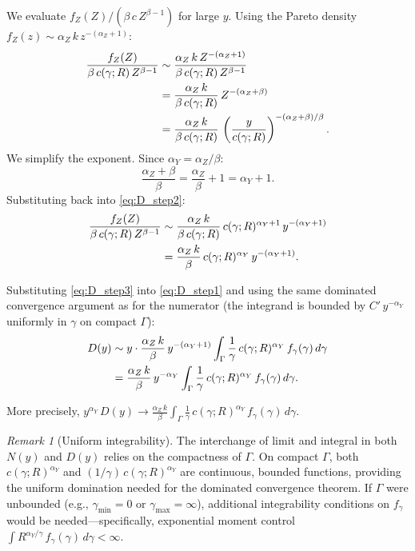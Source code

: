 \documentclass[12pt,a4paper]{article}
\theoremstyle{definition}
\theoremstyle{plain}
\theoremstyle{remark}
\newtheorem{remark}{Remark}[section]
\begin{document}
We evaluate $f_Z(Z)/(\beta\,c\,Z^{\beta-1})$ for large $y$.  Using the Pareto density $f_Z(z) \sim \alpha_Z\,k\,z^{-(\alpha_Z+1)}$:
\begin{align}
  \frac{f_Z(Z)}{\beta\,c(\gamma;R)\,Z^{\beta-1}}
  &\sim \frac{\alpha_Z\,k\,Z^{-(\alpha_Z+1)}}{\beta\,c(\gamma;R)\,Z^{\beta-1}} \notag \\
  &= \frac{\alpha_Z\,k}{\beta\,c(\gamma;R)}\,Z^{-(\alpha_Z+\beta)} \notag \\
  &= \frac{\alpha_Z\,k}{\beta\,c(\gamma;R)}\,\left(\frac{y}{c(\gamma;R)}\right)^{-(\alpha_Z+\beta)/\beta}. \label{eq:D_step2}
\end{align}
We simplify the exponent.  Since $\alpha_Y = \alpha_Z/\beta$:
\[
  \frac{\alpha_Z + \beta}{\beta} = \frac{\alpha_Z}{\beta} + 1 = \alpha_Y + 1.
\]
Substituting back into \eqref{eq:D_step2}:
\begin{align}
  \frac{f_Z(Z)}{\beta\,c(\gamma;R)\,Z^{\beta-1}}
  &\sim \frac{\alpha_Z\,k}{\beta\,c(\gamma;R)}\,c(\gamma;R)^{\alpha_Y+1}\,y^{-(\alpha_Y+1)} \notag \\
  &= \frac{\alpha_Z\,k}{\beta}\,c(\gamma;R)^{\alpha_Y}\,y^{-(\alpha_Y+1)}. \label{eq:D_step3}
\end{align}

Substituting \eqref{eq:D_step3} into \eqref{eq:D_step1} and using the same dominated convergence argument as for the numerator (the integrand is bounded by $C'\,y^{-\alpha_Y}$ uniformly in $\gamma$ on compact $\Gamma$):
\begin{align}
  D(y) &\sim y \cdot \frac{\alpha_Z\,k}{\beta}\,y^{-(\alpha_Y+1)}\int_{\Gamma} \frac{1}{\gamma}\,c(\gamma;R)^{\alpha_Y}\,f_{\gamma}(\gamma)\,d\gamma \notag \\
  &= \frac{\alpha_Z\,k}{\beta}\,y^{-\alpha_Y}\int_{\Gamma} \frac{1}{\gamma}\,c(\gamma;R)^{\alpha_Y}\,f_{\gamma}(\gamma)\,d\gamma. \label{eq:D_asymp_final}
\end{align}

More precisely, $y^{\alpha_Y}\,D(y) \to \frac{\alpha_Z\,k}{\beta}\int_{\Gamma} \frac{1}{\gamma}\,c(\gamma;R)^{\alpha_Y}\,f_{\gamma}(\gamma)\,d\gamma$.

\begin{remark}[Uniform integrability]
\label{rem:uniform_integrability_2D}
The interchange of limit and integral in both $N(y)$ and $D(y)$ relies on the compactness of $\Gamma$.  On compact $\Gamma$, both $c(\gamma;R)^{\alpha_Y}$ and $(1/\gamma)\,c(\gamma;R)^{\alpha_Y}$ are continuous, bounded functions, providing the uniform domination needed for the dominated convergence theorem.  If $\Gamma$ were unbounded (e.g., $\gamma_{\min} = 0$ or $\gamma_{\max} = \infty$), additional integrability conditions on $f_{\gamma}$ would be needed---specifically, exponential moment control $\int R^{\alpha_Y/\gamma}\,f_{\gamma}(\gamma)\,d\gamma < \infty$.
\end{remark}
\end{document}

